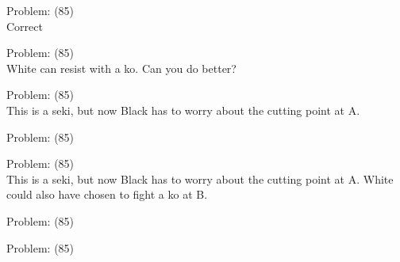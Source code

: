 \documentclass[11pt]{article}
\begin{document}
\begin{minipage}[t]{0.5\textwidth}
  {\centering
  
Problem: (85)\\
Correct\\
  }
\end{minipage}
\begin{minipage}[t]{0.5\textwidth}
  {\centering
  
Problem: (85)\\
White can resist with a ko. Can you do better?\\
  }
\end{minipage}
\begin{minipage}[t]{0.5\textwidth}
  {\centering
  
Problem: (85)\\
This is a seki, but now Black has to worry about the cutting point at A.\\
  }
\end{minipage}
\begin{minipage}[t]{0.5\textwidth}
  {\centering
  
Problem: (85)\\
  }
\end{minipage}
\begin{minipage}[t]{0.5\textwidth}
  {\centering
  
Problem: (85)\\
This is a seki, but now Black has to worry about the cutting point at A. White could also have chosen to fight a ko at B.\\
  }
\end{minipage}
\begin{minipage}[t]{0.5\textwidth}
  {\centering
  
Problem: (85)\\
  }
\end{minipage}
\begin{minipage}[t]{0.5\textwidth}
  {\centering
  
Problem: (85)\\
  }
\end{minipage}
\end{document}

